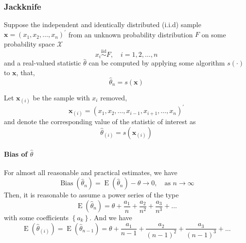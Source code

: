 \subsubsection{Jackknife}

Suppose the independent and identically distributed (i.i.d) sample $\boldsymbol{x}=\left(x_{1},x_{2},\ldots,x_{n}\right)^{\prime}$ from an unknown probability distribution $F$ on some probability space $\mathcal{X}$
\begin{equation}
    x_{i}\stackrel{\text{iid}}{\sim}F,\quad i=1,2,\ldots,n
\end{equation}
and a real-valued statistic $\hat{\theta}$ can be computed by applying some algorithm $s(\cdot)$ to $\mathbf{x}$, that,
\begin{equation}
    \hat{\theta}_{n}=s(\mathbf{x})
\end{equation}

Let $\mathbf{x}_{(i)}$ be the sample with $x_{i}$ removed,
\begin{equation}
    \mathbf{x}_{(i)}=\left(x_{1},x_{2},\ldots,x_{i-1},x_{i+1},\ldots,x_{n}\right)^{\prime}
\end{equation}
and denote the corresponding value of the statistic of interest as
\begin{equation}
    \hat{\theta}_{(i)}=s\left(\mathbf{x}_{(i)}\right)
\end{equation}

\paragraph{Bias of $\hat{\theta}$}

For almost all reasonable and practical estimates, we have \begin{equation}
    \operatorname{Bias}(\hat{\theta}_{n})=\operatorname{E}(\hat{\theta}_{n})-\theta\rightarrow 0,\quad\text{as }n\rightarrow\infty
\end{equation}
Then, it is reasonable to assume a power series of the type
\begin{equation}
    \operatorname{E}(\hat{\theta}_{n})=\theta+\frac{a_{1}}{n}+\frac{a_{2}}{n^{2}}+\frac{a_{3}}{n^{3}}+\ldots
\end{equation}
with some coefficients $\left\{a_{k}\right\}$. And we have
\begin{equation}
    \operatorname{E}(\hat{\theta}_{(i)})=\operatorname{E}(\hat{\theta}_{n-1})=\theta+\frac{a_{1}}{n-1}+\frac{a_{2}}{\left(n-1\right)^{2}}+\frac{a_{3}}{\left(n-1\right)^{3}}+\ldots
\end{equation}


